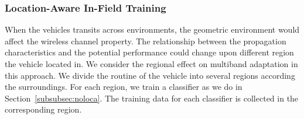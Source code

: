 \subsubsection{Location-Aware In-Field Training}
When the vehicles transits across environments, the geometric 
environment would affect the wireless channel property. The 
relationship between the propagation characteristics and the 
potential performance could change upon different region the
vehicle located in. We consider the regional effect on multiband 
adaptation in this approach. We divide the routine of the vehicle
into several regions according the surroundings. For each region,
we train a classifier as we do in Section~\ref{subsubsec:noloca}.
The training data for each classifier is collected in the corresponding
region.
